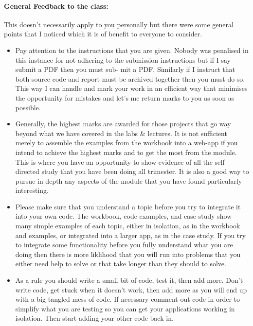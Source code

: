 \documentclass[letterpaper,11pt]{../resources/texMemo}
\begin{document}
\begin{description}
\end{description}

\newpage
\paragraph{General Feedback to the class:} This doesn’t necessarily apply to you personally but there were some general points that I noticed which it is of benefit to everyone to consider.

\begin{itemize}
\item Pay attention to the instructions that you are given. Nobody was penalised in this instance for not adhering to the submission instructions but if I say submit a PDF then you must sub- mit a PDF. Similarly if I instruct that both source code and report must be archived together then you must do so. This way I can handle and mark your work in an efficient way that minimises the opportunity for mistakes and let’s me return marks to you as soon as possible.
\item Generally, the highest marks are awarded for those projects that go way beyond what we have covered in the labs \& lectures. It is not sufficient merely to assemble the examples from the workbook into a web-app if you intend to achieve the highest marks and to get the most from the module. This is where you have an opportunity to show evidence of all the self-directed study that you have been doing all trimester. It is also a good way to pursue in depth any aspects of the module that you have found particularly interesting.
\item Please make sure that you understand a topic before you try to integrate it into your own code. The workbook, code examples, and case study show many simple examples of each topic, either in isolation, as in the workbook and examples, or integrated into a larger app, as in the case study. If you try to integrate some functionality before you fully understand what you are doing then there is more liklihood that you will run into problems that you either need help to solve or that take longer than they should to solve.
\item As a rule you should write a small bit of code, test it, then add more. Don’t write code, get stuck when it doesn’t work, then add more as you will end up with a big tangled mess of code. If necessary comment out code in order to simplify what you are testing so you can get your applications working in isolation. Then start adding your other code back in.

\end{itemize}
\end{document}

